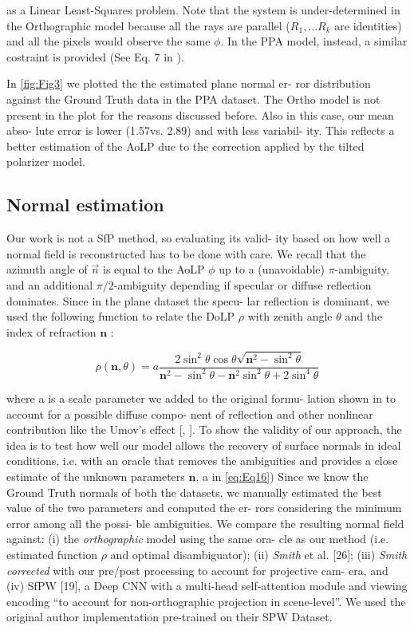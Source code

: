 \documentclass[letterpaper, 6 pt, journal, twoside]{IEEEtran}
\begin{document}
as a Linear Least-Squares problem. Note that the system is
under-determined in the Orthographic model because all the
rays are parallel ($R_1 , . . . R_k$ are identities) and all the pixels
would observe the same $\phi$. In the PPA model, instead, a
similar costraint is provided (See Eq. 7 in \cite{chen2022perspective}).
    
    In \cref{fig:Fig3} we plotted the the estimated plane normal er-
ror distribution against the Ground Truth data in the PPA
dataset. The Ortho model is not present in the plot for the
reasons discussed before. Also in this case, our mean abso-
lute error is lower (1.57\textdegree vs. 2.89\textdegree) and with less variabil-
ity. This reflects a better estimation of the AoLP due to the
correction applied by the tilted polarizer model.

\subsection{Normal estimation}

    Our work is not a SfP method, so evaluating its valid-
ity based on how well a normal field is reconstructed has to
be done with care. We recall that the azimuth angle of $\Vec{n}$ is
equal to the AoLP $\phi$ up to a (unavoidable) $\pi$-ambiguity, and
an additional $\pi/2$-ambiguity depending if specular or diffuse
reflection dominates. Since in the plane dataset the specu-
lar reflection is dominant, we used the following function
to relate the DoLP $\rho$ with zenith angle $\theta$ and the index of
refraction $\mathbf{n}$ :

\begin{equation}
        \rho(\mathbf{n},\theta) = a \frac{2\sin^2\theta\cos\theta\sqrt{\mathbf{n}^2 - \sin^2\theta}}{\mathbf{n}^2-\sin^2\theta-\mathbf{n}^2\sin^2\theta+2\sin^4\theta}
        \label{eq:Eq16}
\end{equation}

where a is a scale parameter we added to the original formu-
lation shown in \cite{atkinson2006recovery} to account for a possible diffuse compo-
nent of reflection and other nonlinear contribution like the
Umov’s effect [\cite{kupinski2019angle}, \cite{umow1905chromatische}].
To show the validity of our approach, the idea is to test
how well our model allows the recovery of surface normals
in ideal conditions, i.e. with an oracle that removes the
ambiguities and provides a close estimate of the unknown
parameters $\mathbf{n}$, a in \cref{eq:Eq16}) Since we know the Ground
Truth normals of both the datasets, we manually estimated
the best value of the two parameters and computed the er-
rors considering the minimum error among all the possi-
ble ambiguities. We compare the resulting normal field
against: (i) the \textit{orthographic} model using the same ora-
cle as our method (i.e. estimated function $\rho$ and optimal
disambiguator); (ii) \textit{Smith} et al. [26]; (iii) \textit{Smith corrected}
with our pre/post processing to account for projective cam-
era, and (iv) SfPW [19], a Deep CNN with a multi-head
self-attention module and viewing encoding “to account for
non-orthographic projection in scene-level”. We used the
original author implementation pre-trained on their SPW
Dataset.
\end{document}
